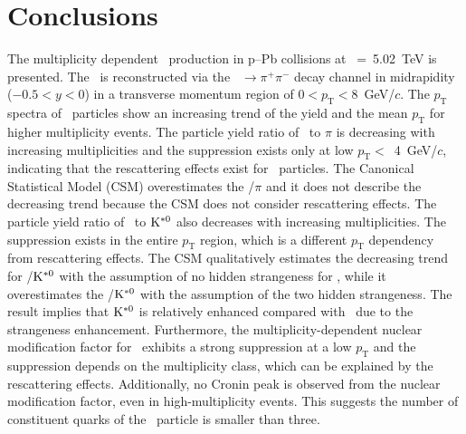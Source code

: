 
\section{Conclusions}
\label{sec:summary}

The multiplicity dependent \fzero~production in p--Pb collisions at \snn~=~5.02~TeV is presented. The \fzero~is reconstructed via the \fzero~$\rightarrow\pi^{+}\pi^{-}$ decay channel in midrapidity ($-0.5<y<0$) in a transverse momentum region of $0<p_{\mathrm{T}}<8$~GeV/$c$. The $p_{\mathrm{T}}$ spectra of \fzero~particles show an increasing trend of the yield and the mean $p_{\mathrm{T}}$ for higher multiplicity events. The particle yield ratio of \fzero~to $\pi$ is decreasing with increasing multiplicities and the suppression exists only at low $p_{\mathrm{T}}<$~4~GeV/$c$, indicating that the rescattering effects exist for \fzero~particles. The Canonical Statistical Model (CSM) overestimates the \fzero/$\pi$ and it does not describe the decreasing trend because the CSM does not consider rescattering effects. The particle yield ratio of \fzero~to $\rm{}K^{*0}$ also decreases with increasing multiplicities. The suppression exists in the entire $p_{\mathrm{T}}$ region, which is a different $p_{\mathrm{T}}$ dependency from rescattering effects. The CSM qualitatively estimates the decreasing trend for \fzero/$\rm{}K^{*0}$ with the assumption of no hidden strangeness for \fzero, while it overestimates the \fzero/$\rm{}K^{*0}$ with the assumption of the two hidden strangeness. The result implies that $\rm{}K^{*0}$ is relatively enhanced compared with \fzero~due to the strangeness enhancement. Furthermore, the multiplicity-dependent nuclear modification factor for \fzero~exhibits a strong suppression at a low $p_{\mathrm{T}}$ and the suppression depends on the multiplicity class, which can be explained by the rescattering effects. Additionally, no Cronin peak is observed from the nuclear modification factor, even in high-multiplicity events. This suggests the number of constituent quarks of the \fzero~particle is smaller than three.